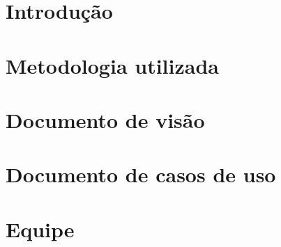 \section{Introdução} %
\label{sec:introdu_o}
 

\section{Metodologia utilizada} %
\label{sec:metodologia}
 

\section{Documento de visão}
\label{sec:document_de_visao}


\section{Documento de casos de uso}
\label{sec:documento_de_caso_de_uso}


\section{Equipe} %
\label{sec:equipe}


%

%
